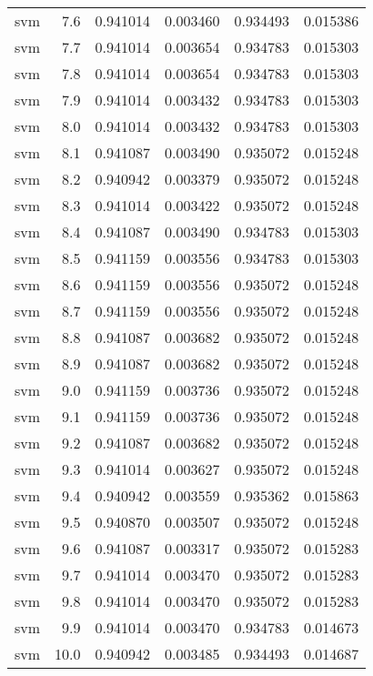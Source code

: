 \begin{tabular}{lrrrrr}
     svm &        7.6 &    0.941014 &   0.003460 &   0.934493 &  0.015386 \\
     svm &        7.7 &    0.941014 &   0.003654 &   0.934783 &  0.015303 \\
     svm &        7.8 &    0.941014 &   0.003654 &   0.934783 &  0.015303 \\
     svm &        7.9 &    0.941014 &   0.003432 &   0.934783 &  0.015303 \\
     svm &        8.0 &    0.941014 &   0.003432 &   0.934783 &  0.015303 \\
     svm &        8.1 &    0.941087 &   0.003490 &   0.935072 &  0.015248 \\
     svm &        8.2 &    0.940942 &   0.003379 &   0.935072 &  0.015248 \\
     svm &        8.3 &    0.941014 &   0.003422 &   0.935072 &  0.015248 \\
     svm &        8.4 &    0.941087 &   0.003490 &   0.934783 &  0.015303 \\
     svm &        8.5 &    0.941159 &   0.003556 &   0.934783 &  0.015303 \\
     svm &        8.6 &    0.941159 &   0.003556 &   0.935072 &  0.015248 \\
     svm &        8.7 &    0.941159 &   0.003556 &   0.935072 &  0.015248 \\
     svm &        8.8 &    0.941087 &   0.003682 &   0.935072 &  0.015248 \\
     svm &        8.9 &    0.941087 &   0.003682 &   0.935072 &  0.015248 \\
     svm &        9.0 &    0.941159 &   0.003736 &   0.935072 &  0.015248 \\
     svm &        9.1 &    0.941159 &   0.003736 &   0.935072 &  0.015248 \\
     svm &        9.2 &    0.941087 &   0.003682 &   0.935072 &  0.015248 \\
     svm &        9.3 &    0.941014 &   0.003627 &   0.935072 &  0.015248 \\
     svm &        9.4 &    0.940942 &   0.003559 &   0.935362 &  0.015863 \\
     svm &        9.5 &    0.940870 &   0.003507 &   0.935072 &  0.015248 \\
     svm &        9.6 &    0.941087 &   0.003317 &   0.935072 &  0.015283 \\
     svm &        9.7 &    0.941014 &   0.003470 &   0.935072 &  0.015283 \\
     svm &        9.8 &    0.941014 &   0.003470 &   0.935072 &  0.015283 \\
     svm &        9.9 &    0.941014 &   0.003470 &   0.934783 &  0.014673 \\
     svm &       10.0 &    0.940942 &   0.003485 &   0.934493 &  0.014687 \\
\bottomrule
\end{tabular}
